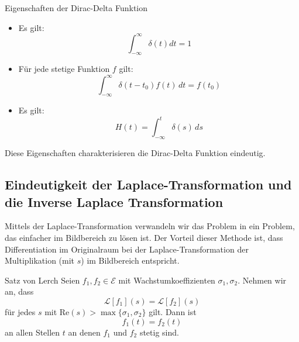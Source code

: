 \documentclass[a4paper,10pt]{article}
\def\Re{\text{Re}}
\begin{document}
\begin{subbox}{Eigenschaften der Dirac-Delta Funktion}
  \begin{itemize}
    \item{
      Es gilt:
      $$
        \int_{-\infty}^\infty \delta(t) dt = 1
      $$
    }

    \item{
      Für jede stetige Funktion $f$ gilt:
      \begin{equation*}
        \int_{-\infty}^\infty\delta(t-t_0)f(t)\,dt=f(t_0)
    \end{equation*}
    }

    \item{
      Es gilt:
      \begin{equation*}
        H(t)=\int_{-\infty}^t\delta(s)\,ds
    \end{equation*}
    }
  \end{itemize}
  Diese Eigenschaften charakterisieren die Dirac-Delta Funktion eindeutig.
\end{subbox}

\subsection{Eindeutigkeit der Laplace-Transformation und die Inverse Laplace Transformation}

Mittels der Laplace-Transformation verwandeln wir das Problem in ein Problem, das einfacher im Bildbereich zu lösen ist. Der Vorteil dieser Methode ist, dass Differentiation im Originalraum bei der Laplace-Transformation der Multiplikation (mit $s$) im Bildbereich entspricht.

\begin{subbox}{Satz von Lerch}
  Seien \(f_1,f_2\in\mathcal{E}\) mit Wachstumkoeffizienten \(\sigma_1,\sigma_2\). Nehmen wir an, dass \begin{equation*} \mathcal{L}[f_1](s)=\mathcal{L}[f_2](s) \end{equation*} für jedes \(s\) mit \(\Re (s)>\max\{\sigma_1,\sigma_2\}\) gilt. Dann ist \begin{equation*} f_1(t)=f_2(t) \end{equation*} an allen Stellen \(t\) an denen \(f_1\) und \(f_2\) stetig sind.
\end{subbox}
\end{document}
